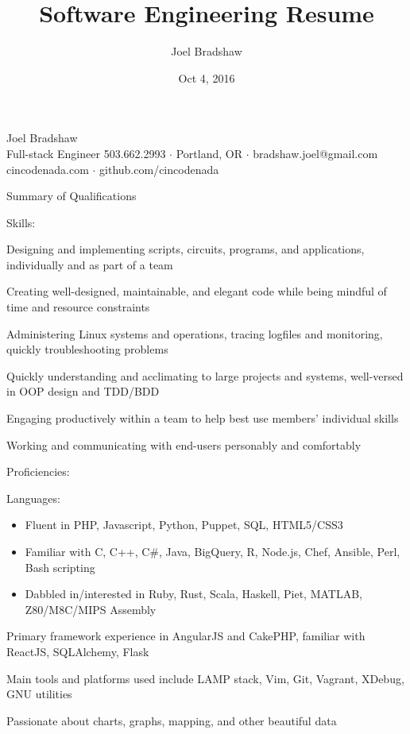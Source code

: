 \documentclass[letterpaper,10pt]{article}
\begin{document}
\title{Software Engineering Resume}
\author{Joel Bradshaw}
\date{Oct 4, 2016}
\begin{center}
{\Huge Joel Bradshaw}\\
\vskip 2pt
{\large Full-stack Engineer}
\vskip 4pt
{\large
    503.662.2993 \ensuremath{\cdot} Portland, OR \ensuremath{\cdot} bradshaw.joel@gmail.com\\
    cincodenada.com \ensuremath{\cdot} github.com/cincodenada}
\end{center}
\vskip -8pt

\begin{res_section}{Summary of Qualifications}
\begin{res_subsection}{Skills:}
  \item Designing and implementing scripts, circuits, programs, and applications, individually and as part of a team
  \item Creating well-designed, maintainable, and elegant code while being mindful of time and resource constraints
  \item Administering Linux systems and operations, tracing logfiles and monitoring, quickly troubleshooting problems
  \item Quickly understanding and acclimating to large projects and systems, well-versed in OOP design and TDD/BDD
  \item Engaging productively within a team to help best use members' individual skills
  \item Working and communicating with end-users personably and comfortably
\end{res_subsection}
\begin{res_subsection}{Proficiencies:}
  \item Languages:
  \def \multicolsep {0pt}
  \setlength{\columnsep}{-8pt}
  \begin{itemize}
    \item Fluent in PHP, Javascript, Python, Puppet, SQL, HTML5/CSS3
    \item Familiar with C, C++, C\#, Java, BigQuery, R, Node.js, Chef, Ansible, Perl, Bash scripting
    \item Dabbled in/interested in Ruby, Rust, Scala, Haskell, Piet, MATLAB, Z80/M8C/MIPS Assembly
  \end{itemize}
  \item Primary framework experience in AngularJS and CakePHP, familiar with ReactJS, SQLAlchemy, Flask
  \item Main tools and platforms used include LAMP stack, Vim, Git, Vagrant, XDebug, GNU utilities
  \item Passionate about charts, graphs, mapping, and other beautiful data
\end{res_subsection}
\end{res_section}
\end{document}
